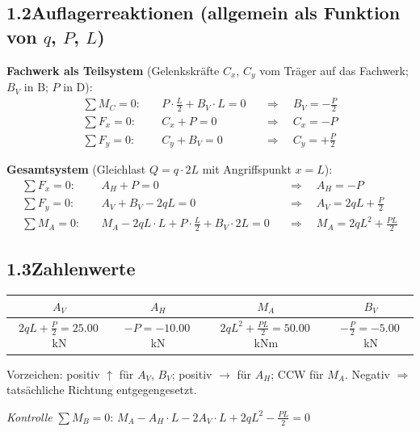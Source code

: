 \documentclass[a4paper,11pt]{article}
\begin{document}
\subsection*{1.2\quad Auflagerreaktionen (allgemein als Funktion von $q$, $P$, $L$)}

\textbf{Fachwerk als Teilsystem}
(Gelenkskräfte $C_x$, $C_y$ vom Träger auf das Fachwerk; $B_V$ in B; $P$ in D):
\begin{align*}
  \sum M_C = 0:\quad & P \cdot \tfrac{L}{2} + B_V \cdot L = 0
    &&\Rightarrow\quad \boxed{B_V = -\tfrac{P}{2}} \\
  \sum F_x = 0:\quad & C_x + P = 0
    &&\Rightarrow\quad C_x = -P \\
  \sum F_y = 0:\quad & C_y + B_V = 0
    &&\Rightarrow\quad C_y = +\tfrac{P}{2}
\end{align*}

\textbf{Gesamtsystem} (Gleichlast $Q = q \cdot 2L$ mit Angriffspunkt $x = L$):
\begin{align*}
  \sum F_x = 0:\quad & A_H + P = 0
    &&\Rightarrow\quad \boxed{A_H = -P} \\
  \sum F_y = 0:\quad & A_V + B_V - 2qL = 0
    &&\Rightarrow\quad \boxed{A_V = 2qL + \tfrac{P}{2}} \\
  \sum M_A = 0:\quad & M_A - 2qL \cdot L + P\cdot\tfrac{L}{2} + B_V \cdot 2L = 0
    &&\Rightarrow\quad \boxed{M_A = 2qL^2 + \tfrac{PL}{2}}
\end{align*}

\subsection*{1.3\quad Zahlenwerte}

\begin{center}
\begin{tabular}{cccc}
\toprule
$A_V$ & $A_H$ & $M_A$ & $B_V$ \\
\midrule
$2qL + \tfrac{P}{2} = \mathbf{25.00}$\,kN
& $-P = \mathbf{-10.00}$\,kN
& $2qL^2 + \tfrac{PL}{2} = \mathbf{50.00}$\,kNm
& $-\tfrac{P}{2} = \mathbf{-5.00}$\,kN \\
\bottomrule
\end{tabular}
\end{center}

Vorzeichen: positiv $\uparrow$ für $A_V$, $B_V$; positiv $\rightarrow$ für $A_H$;
CCW für $M_A$. Negativ $\Rightarrow$ tatsächliche Richtung entgegengesetzt.

\textit{Kontrolle} $\sum M_B = 0$:
$M_A - A_H \cdot L - 2A_V \cdot L + 2qL^2 - \tfrac{PL}{2} = 0$\;
\checkmark
\end{document}
